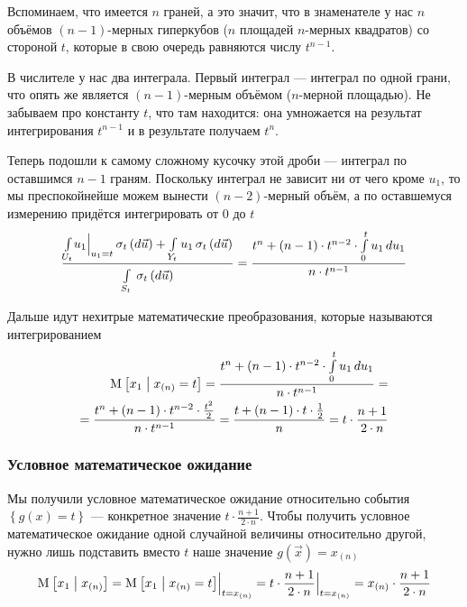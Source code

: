 Вспоминаем, что имеется $n$ граней, а это значит, что в знаменателе
у нас $n$ объёмов $\left( n-1 \right)$-мерных гиперкубов
($n$ площадей $n$-мерных квадратов)
со стороной $t$, которые в свою очередь равняются числу $t^{n-1}$.

В числителе у нас два интеграла.
Первый интеграл --- интеграл по одной грани, что опять же является
$\left( n-1 \right)$-мерным объёмом ($n$-мерной площадью).
Не забываем про константу $t$, что там находится: она умножается
на результат интегрирования $t^{n-1}$ и в результате получаем $t^n$.

Теперь подошли к самому сложному кусочку этой дроби ---
интеграл по оставшимся $n-1$ граням.
Поскольку интеграл не зависит ни от чего кроме $u_1$, то мы преспокойнейше
можем вынести $\left( n-2 \right)$-мерный объём, а по оставшемуся измерению
придётся интегрировать от $0$ до $t$
$$\frac{\integrall{U_t}{\sigma_{t}\left(d\vec{u} \right)}{
        \Bigl. u_1 \Bigr|_{u_1 = t}}
            + \integrall{Y_t}{\sigma_{t}\left(d\vec{u} \right)}{
                u_1}}{
        \integrall{S_t}{\sigma_{t}\left(d\vec{u} \right)}{}}
    = \frac{t^n + \left( n-1 \right) \cdot t^{n-2}
        \cdot \integral{0}{t}{u_1}{u_1}}{n \cdot t^{n-1}}$$

Дальше идут нехитрые математические преобразования,
которые называются интегрированием
\begin{align*}
    \Mean{x_1 \mcond x_{\left( n \right)} = t}
    = \frac{t^n + \left( n-1 \right) \cdot t^{n-2} 
        \cdot \integral{0}{t}{u_1}{u_1}}{n \cdot t^{n-1}} = \\
    = \frac{t^n + \left( n-1 \right) \cdot t^{n-2}
        \cdot \frac{t^2}{2}}{n \cdot t^{n-1}}
    = \frac{t + \left( n-1 \right) \cdot t \cdot \frac{1}{2}}{n}
    = t \cdot \frac{n+1}{2 \cdot n}
\end{align*}

\subsubsection{Условное математическое ожидание}
Мы получили условное математическое ожидание относительно события
$\left\{ g\left( x \right) = t \right\}$ --- конкретное значение
$t \cdot \frac{n+1}{2 \cdot n}$.
Чтобы получить условное математическое ожидание одной случайной величины
относительно другой, нужно лишь подставить вместо $t$
наше значение $g\left( \vec{x} \right) = x_{\left( n \right)}$
$$\Mean{x_1 \mcond x_{\left( n \right)}}
    = \Bigl. \Mean{x_1 \mcond x_{\left( n \right)} = t}
        \Bigr|_{t = x_{\left( n \right)}}
    = \Bigl. t \cdot \frac{n+1}{2 \cdot n} \Bigr|_{t = x_{\left( n \right)}}
    = x_{\left( n \right)} \cdot \frac{n+1}{2 \cdot n}$$

